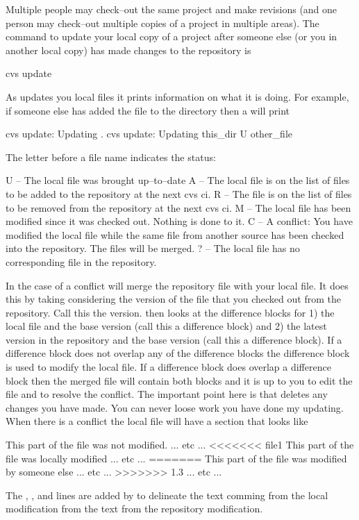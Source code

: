Multiple people may check--out the same project and make revisions
(and one person may check--out multiple copies of a project in
multiple areas). The command to update your local copy of a project
after someone else (or you in another local copy) has made changes to
the repository is
\begin{example}
  cvs update
\end{example}
As \cvs updates you local files it prints information on what it is
doing. For example, if someone else has added the file 
to the  directory then a  will print
\begin{example}
  cvs update: Updating .
  cvs update: Updating this_dir
  U other_file
\end{example}
The letter before a file name indicates the status:
\begin{example}
  U -- The local file was brought up--to--date
  A -- The local file is on the list of files to be added to the repository
          at the next cvs ci.
  R -- The file is on the list of files to be removed from the repository
          at the next cvs ci.
  M -- The local file has been modified since it was checked out. 
          Nothing is done to it.
  C -- A conflict: You have modified the local file while the same file
          from another source has been checked into the repository.
          The files will be merged.
  ? -- The local file has no corresponding file in the repository.
\end{example}
In the case of a conflict \cvs will merge the repository file with
your local file. It does this by taking considering the version of the
file that you checked out from the repository. Call this the 
version. \cvs then looks at the difference blocks for 1) the local
file and the base version (call this a  difference block)
and 2) the latest version in the repository and the base version (call
this a  difference block). If a 
difference block does not overlap any of the  difference
blocks the difference block is used to modify the local file. If a
 difference block does overlap a  difference
block then the merged file will contain both blocks and it is up to
you to edit the file and to resolve the conflict. The important point
here is that  deletes any changes you have made. You
can never loose work you have done my updating. When there is a
conflict the local file will have a section that looks like
\begin{example}
  This part of the file was not modified.
  ... etc ...
  <<<<<<< file1
  This part of the file was locally modified
  ... etc ...
  =======
  This part of the file was modified by someone else
  ... etc ...
  >>>>>>> 1.3
  ... etc ...
\end{example}
The , \vn{=======}, and  lines are
added by \cvs to delineate the text comming from the local
modification from the text from the repository modification.


